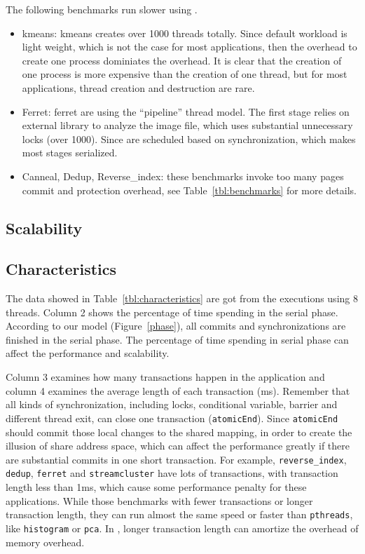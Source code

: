 The following benchmarks run slower using \dthreads{}.  
\begin{itemize}
\item kmeans: kmeans creates over 1000 threads totally. Since default workload is light weight, which is not the case for most applications, 
then the overhead to create one process dominiates the overhead. It is clear that the creation of one process is more expensive than the creation of one thread, but for most applications, thread creation and destruction are rare.
\item Ferret: ferret are using the ``pipeline'' thread model. The first stage relies on external library to 
analyze the image file, which uses substantial unnecessary locks (over 1000). Since \dthreads{} are scheduled based on 
synchronization, which makes most stages serialized.
\item Canneal, Dedup, Reverse\_index: these benchmarks invoke too many pages commit and protection overhead, 
see Table~\ref{tbl:benchmarks} for more details.
\end{itemize}

\subsection{Scalability}

\subsection{Characteristics}

The data showed in Table~\ref{tbl:characteristics} are got from the executions using 8 threads. 
Column 2 shows the percentage of time spending in the serial phase. According to our model (Figure~\ref{phase}), 
all commits and synchronizations are finished in the serial phase. 
The percentage of time spending in serial phase can affect the performance and scalability.

Column 3 examines how many transactions happen in the application and 
column 4 examines the average length of each transaction (ms). 
Remember that all kinds of synchronization, including locks, conditional variable, barrier 
and different thread exit, can close one transaction (\texttt{atomicEnd}).
Since \texttt{atomicEnd} should commit those local changes to 
the shared mapping, in order to create the illusion of share address space, 
which can affect the performance greatly if there are substantial commits in one short transaction. 
For example, \texttt{reverse\_index}, \texttt{dedup}, \texttt{ferret} and \texttt{streamcluster}
have lots of transactions, with transaction length less than 1ms, 
which cause some performance penalty for these applications. 
While those benchmarks with fewer transactions or longer transaction length, they can run almost the same speed or faster than \texttt{pthreads}, like \texttt{histogram} or \texttt{pca}.
In \dthreads{}, longer transaction length can amortize the overhead of memory overhead. 

